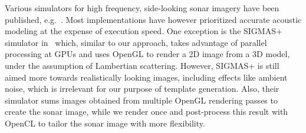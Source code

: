 \documentclass[12pt,journal,draftclsnofoot,onecolumn]{IEEEtran}
\newcommand\1{\vec 1}
\begin{document}
Various simulators for high frequency, side-looking sonar imagery have been published, e.g.~\cite{Bell1997,Sammelm2003}. Most implementations have however prioritized accurate acoustic modeling at the expense of execution speed. One exception is the SIGMAS+ simulator in~\cite{Coiras2009a, Coiras2009b} which, similar to our approach, takes advantage of parallel processing at GPUs and uses OpenGL to render a 2D image from a 3D model, under the assumption of Lambertian scattering. However, SIGMAS+ is still aimed more towards realistically looking images, including effects like ambient noise, which is irrelevant for our purpose of template generation. Also, their simulator sums images obtained from multiple OpenGL rendering passes to create the sonar image, while we render once and post-process this result with OpenCL to tailor the sonar image with more flexibility.


% 
\end{document}
